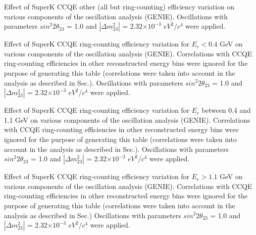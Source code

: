 \clearpage

%
%

%
%
%
%

\caption{ 
  Effect of SuperK CCQE other (all but ring-counting) efficiency variation
  on various components of the oscillation analysis (GENIE).
  Oscillations with parameters $sin^{2}2\theta_{23}$ = 1.0 and $|\Delta m^{2}_{23}|$ = 2.32$\times10^{-3}$ $eV^{2}/c^{4}$ were applied.  
}


%
%
%
%

\caption{ 
  Effect of SuperK CCQE ring-counting efficiency variation for $E_{r}<0.4$ GeV  
  on various components of the oscillation analysis (GENIE).
  Correlations with CCQE ring-counting efficiencies in other reconstructed energy bins were ignored for the purpose of generating
  this table (correlations were taken into account in the analysis as described in Sec.).
  Oscillations with parameters $sin^{2}2\theta_{23}$ = 1.0 and $|\Delta m^{2}_{23}|$ = 2.32$\times10^{-3}$ $eV^{2}/c^{4}$ were applied.  
}

%
%
%
%

\caption{ 
  Effect of SuperK CCQE ring-counting efficiency variation for $E_{r}$ between 0.4 and 1.1 GeV  
  on various components of the oscillation analysis (GENIE).
  Correlations with CCQE ring-counting efficiencies in other reconstructed energy bins were ignored for the purpose of generating
  this table (correlations were taken into account in the analysis as described in Sec.).
  Oscillations with parameters $sin^{2}2\theta_{23}$ = 1.0 and $|\Delta m^{2}_{23}|$ = 2.32$\times10^{-3}$ $eV^{2}/c^{4}$ were applied.  
}

%
%
%
%

\caption{ 
  Effect of SuperK CCQE ring-counting efficiency variation for $E_{r}>1.1$ GeV  
  on various components of the oscillation analysis (GENIE).
  Correlations with CCQE ring-counting efficiencies in other reconstructed energy bins were ignored for the purpose of generating
  this table (correlations were taken into account in the analysis as described in Sec.)
  Oscillations with parameters $sin^{2}2\theta_{23}$ = 1.0 and $|\Delta m^{2}_{23}|$ = 2.32$\times10^{-3}$ $eV^{2}/c^{4}$ were applied.  
}


